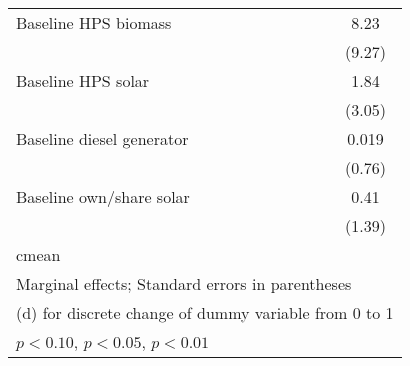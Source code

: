 \begin{table}[htbp]
\begin{tabular*}{1\hsize}{@{\hskip\tabcolsep\extracolsep\fill}l*{5}{c}}
Baseline HPS biomass&                  &                  &                  &                  &     8.23         \\
                &                  &                  &                  &                  &   (9.27)         \\
Baseline HPS solar&                  &                  &                  &                  &     1.84         \\
                &                  &                  &                  &                  &   (3.05)         \\
Baseline diesel generator&                  &                  &                  &                  &    0.019         \\
                &                  &                  &                  &                  &   (0.76)         \\
Baseline own/share solar&                  &                  &                  &                  &     0.41         \\
                &                  &                  &                  &                  &   (1.39)         \\
\midrule
cmean           &                  &                  &                  &                  &                  \\
\bottomrule
\multicolumn{6}{l}{\footnotesize Marginal effects; Standard errors in parentheses}\\
\multicolumn{6}{l}{\footnotesize  (d) for discrete change of dummy variable from 0 to 1}\\
\multicolumn{6}{l}{\footnotesize \sym{*} \(p<0.10\), \sym{**} \(p<0.05\), \sym{***} \(p<0.01\)}\\
\end{tabular*}
\end{table}
